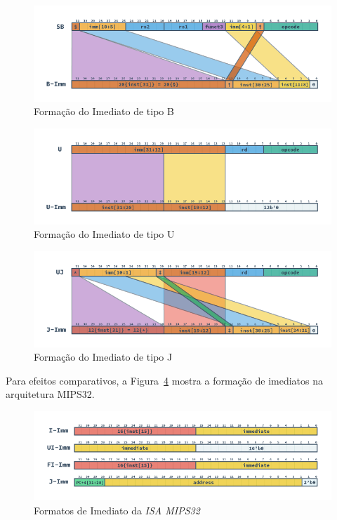 \begin{figure}[H]
\centering
    \includegraphics[width=1\linewidth]{images/RV_B_Imm.png}
    \caption{Formação do Imediato de tipo B
        }\label{fig:riscv_b_imm}
\end{figure}

\begin{figure}[H]
\centering
    \includegraphics[width=1\linewidth]{images/RV_U_Imm.png}
    \caption{Formação do Imediato de tipo U
        }\label{fig:riscv_u_imm}
\end{figure}

\begin{figure}[H]
\centering
    \includegraphics[width=1\linewidth]{images/RV_J_Imm.png}
    \caption{Formação do Imediato de tipo J
        }\label{fig:riscv_j_imm}
\end{figure}

{
    Para efeitos comparativos, a Figura~\ref{fig:mips_immediates} mostra a
    formação de imediatos na arquitetura MIPS32.
}

\begin{figure}[H]
\centering
    \includegraphics[width=1\linewidth]{images/MIPS_Immediates.png}
    \caption{Formatos de Imediato da \textit{ISA MIPS32}}\label{fig:mips_immediates}
\end{figure}

